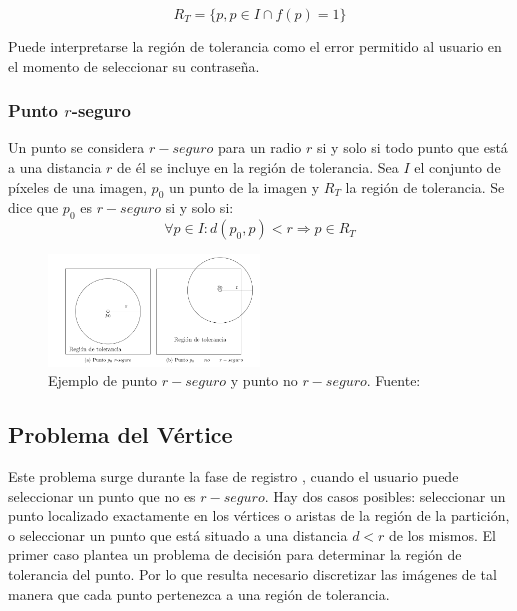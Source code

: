 \begin{equation}
	R_T = \{p, p \in I \cap f(p) = 1\} \label{eq:region_tolerancia}
\end{equation}

Puede interpretarse la región de tolerancia como el error permitido al usuario en el momento de seleccionar su contraseña.

\subsubsection{Punto \texorpdfstring{$r$}{r}-seguro}
Un punto se considera $r-seguro$ \cite{legon2019nuevo,  borrego2018debilidades} para un radio \(r\) si y solo si todo punto que está a una distancia \(r\) de él se incluye en la región de tolerancia. Sea \(I\) el conjunto de píxeles de una imagen, \(p_0\) un punto de la imagen y \(R_T\) la región de tolerancia. Se dice que \(p_0\) es $r-seguro$ si y solo si:
\begin{equation}
	\forall p \in I: d(p_0, p) < r \Rightarrow p \in R_T \label{eq:r_seguro}
\end{equation}
		
\begin{figure}[h]
			\centering
			\includegraphics[width=0.5\textwidth]{punto-r-seguro.png}			
			\caption{Ejemplo de punto $r-seguro$ y punto no $r-seguro$. Fuente: \cite{legon2019nuevo} }
		\end{figure}
		
	
\subsection{Problema del Vértice}
Este problema surge durante la fase de registro \cite{  birget2006graphical, legon2019nuevo, borrego2018debilidades}, cuando el usuario puede seleccionar un punto que no es $r-seguro$. Hay dos casos posibles: seleccionar un punto localizado exactamente en los vértices o aristas de la región de la partición, o seleccionar un punto que está situado a una distancia \(d < r\) de los mismos. El primer caso plantea un problema de decisión para determinar la región de tolerancia del punto. Por lo que resulta necesario discretizar las imágenes de tal manera que cada punto pertenezca a una región de tolerancia.

